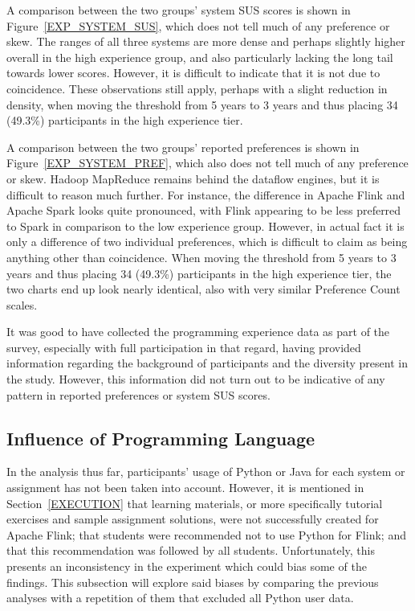   A comparison between the two groups' system SUS scores is shown in Figure~\ref{EXP_SYSTEM_SUS}, which does not tell much of any preference or skew. The ranges of all three systems are more dense and perhaps slightly higher overall in the high experience group, and also particularly lacking the long tail towards lower scores. However, it is difficult to indicate that it is not due to coincidence. These observations still apply, perhaps with a slight reduction in density, when moving the threshold from 5 years to 3 years and thus placing 34 (49.3\%) participants in the high experience tier.
  
  A comparison between the two groups' reported preferences is shown in Figure~\ref{EXP_SYSTEM_PREF}, which also does not tell much of any preference or skew. Hadoop MapReduce remains behind the dataflow engines, but it is difficult to reason much further. For instance, the difference in Apache Flink and Apache Spark looks quite pronounced, with Flink appearing to be less preferred to Spark in comparison to the low experience group. However, in actual fact it is only a difference of two individual preferences, which is difficult to claim as being anything other than coincidence. When moving the threshold from 5 years to 3 years and thus placing 34 (49.3\%) participants in the high experience tier, the two charts end up look nearly identical, also with very similar Preference Count scales.
  
  It was good to have collected the programming experience data as part of the survey, especially with full participation in that regard, having provided information regarding the background of participants and the diversity present in the study. However, this information did not turn out to be indicative of any pattern in reported preferences or system SUS scores.


\subsection{Influence of Programming Language}
\label{LANGUAGE_INFLUENCE}

  In the analysis thus far, participants' usage of Python or Java for each system or assignment has not been taken into account. However, it is mentioned in Section~\ref{EXECUTION} that learning materials, or more specifically tutorial exercises and sample assignment solutions, were not successfully created for Apache Flink; that students were recommended not to use Python for Flink; and that this recommendation was followed by all students. Unfortunately, this presents an inconsistency in the experiment which could bias some of the findings. This subsection will explore said biases by comparing the previous analyses with a repetition of them that excluded all Python user data.
  
